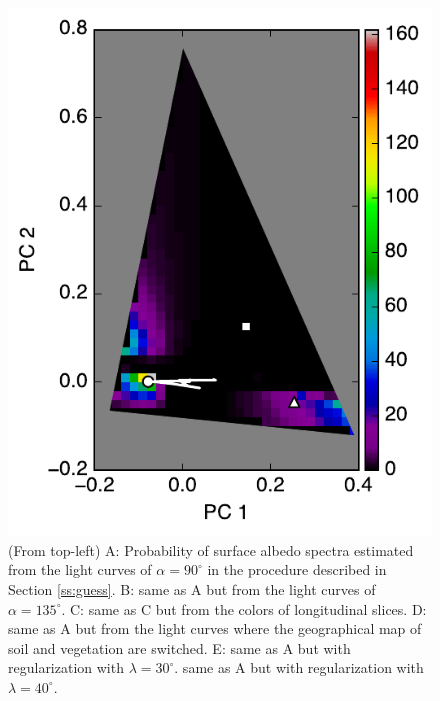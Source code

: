 \documentclass[iop,numberedappendix,apj,]{emulateapj}
\begin{document}
\begin{figure}[tbh!]
\begin{minipage}{0.33\hsize}
\begin{center}
\includegraphics[width=\hsize]{mockdata_90deg_3types_t12_lc_reg_l40deg.pdf}
    \end{center}
     \end{minipage}
    \caption{(From top-left) A: Probability of surface albedo spectra estimated from the light curves of $\alpha = 90^{\circ }$ in the procedure described in Section \ref{ss:guess}. B: same as A but from the light curves of  $\alpha = 135^{\circ }$. C: same as C but from the colors of longitudinal slices.  D: same as A but from the light curves where the geographical map of soil and vegetation are switched. E: same as A but with regularization with $\lambda = 30^{\circ }$. same as A but with regularization with $\lambda = 40^{\circ }$. }
\label{fig:noreg}
\end{figure}
\end{document}
